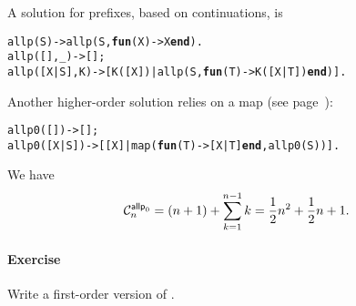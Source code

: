 A solution for prefixes, based on continuations, is
\begin{alltt}
allp(S)       -> allp(S,\textbf{fun}(X) -> X \textbf{end}).
allp(   [],\_) -> [];
allp([X|S],K) -> [K([X])|allp(S,\textbf{fun}(T) -> K([X|T]) \textbf{end})].
\end{alltt}
Another higher\hyp{}order solution  relies on a map
(see page~\pageref{par:maps}):
\begin{alltt}
allp0(   []) -> [];
allp0([X|S]) -> [[X]|map(\textbf{fun}(T) -> [X|T] \textbf{end}, allp0(S))].
\end{alltt}
We have
\begin{equation}
\C{\fun{allp}_0}{n} = (n+1) + \sum_{k=1}^{n-1}k =
\frac{1}{2}n^2 + \frac{1}{2}n + 1.
\end{equation}

\paragraph{Exercise}

Write a first\hyp{}order version of .
